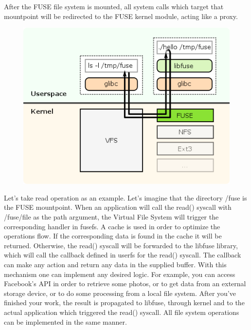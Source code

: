         After the FUSE file system is mounted, all system calls which target that mountpoint will be redirected to the FUSE kernel module, acting like a proxy.
        
        \begin{figure}[h]
           \begin{center}
               \includegraphics[width=15cm]{theoretical/fuse.png}
            \end{center}
        \end{figure}
         
        Let's take read operation as an example. Let's imagine that the directory /fuse is the FUSE mountpoint. When an application will call the read() syscall with /fuse/file as the path argument, the Virtual File System will trigger the corresponding handler in fusefs. A cache is used in order to optimize the operations flow. If the corresponding data is found in the cache it will be returned. Otherwise, the read() syscall will be forwarded to the libfuse library, which will call the callback defined in userfs for the read() syscall. The callback can make any action and return any data in the supplied buffer. With this mechanism one can implement any desired logic. For example, you can access Facebook's API in order to retrieve some photos, or to get data from an external storage device, or to do some processing from a local file system. After you've finished your work, the result is propagated to libfuse, through kernel and to the actual application which triggered the read() syscall. All file system operations can be implemented in the same manner.
        
